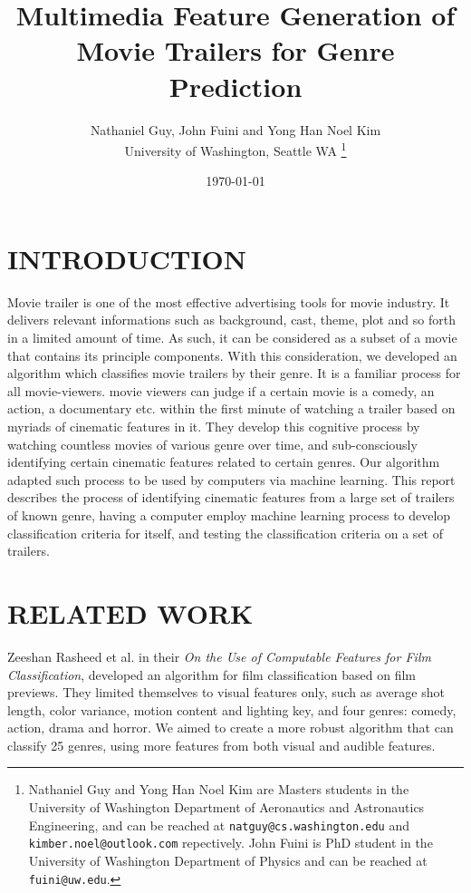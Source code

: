 \documentclass[letterpaper, 10 pt, conference]{ieeeconf}  %
\title{\LARGE \bf
Multimedia Feature Generation of Movie Trailers for Genre Prediction\\
}
\author{Nathaniel Guy, John Fuini and Yong Han Noel Kim\\
	University of Washington, Seattle WA%
\thanks{Nathaniel Guy and Yong Han Noel Kim are Masters students in the University of Washington Department of Aeronautics and Astronautics Engineering, and can be reached at {\tt\small natguy@cs.washington.edu} and {\tt\small kimber.noel@outlook.com} repectively. John Fuini is PhD student in the University of Washington Department of Physics and can be reached at {\tt\small fuini@uw.edu}. }%
}
\date{ \today}
\begin{document}
\maketitle
\thispagestyle{empty}
\pagestyle{empty}

\begin{abstract}



\end{abstract}

\section{INTRODUCTION}
Movie trailer is one of the most effective advertising tools for movie industry. It delivers relevant informations such as background, cast, theme, plot and so forth in a limited amount of time. As such, it can be considered as a subset of a movie that contains its principle components. With this consideration, we developed an algorithm which classifies movie trailers by their genre. It is a familiar process for all movie-viewers. movie viewers can judge if a certain movie is a comedy, an action, a documentary etc. within the first minute of watching a trailer based on myriads of cinematic features in it. They develop this cognitive process by watching countless movies of various genre over time, and sub-consciously identifying certain cinematic features related to certain genres. Our algorithm adapted such process to be used by computers via machine learning. This report describes the process of identifying cinematic features from a large set of trailers of known genre, having a computer employ machine learning process to develop classification criteria for itself, and testing the classification criteria on a set of trailers. 



\section{RELATED WORK}
Zeeshan Rasheed et al. in their \textit{On the Use of Computable Features for Film Classification}\cite{Rasheed}, developed an algorithm for film classification based on film previews. They limited themselves to visual features only, such as average shot length, color variance, motion content and lighting key, and four genres: comedy, action, drama and horror. We aimed to create a more robust algorithm that can classify 25 genres, using more features from both visual and audible features.
\end{document}

